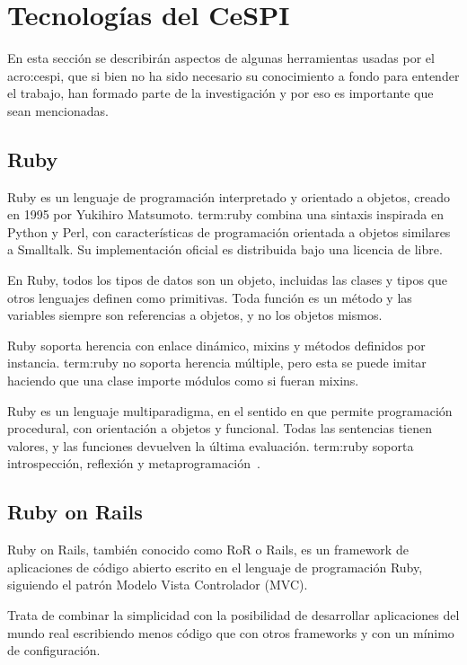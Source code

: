 \section{Tecnologías del CeSPI}
\label{anexo:A}

En esta sección se describirán aspectos de algunas herramientas usadas por el
\gls{acro:cespi}, que si bien no ha sido necesario su conocimiento a fondo para
entender el trabajo, han formado parte de la investigación y por eso es
importante que sean mencionadas.

\subsection{Ruby}

Ruby es un lenguaje de programación interpretado y orientado a objetos, creado
en 1995 por Yukihiro Matsumoto. \gls{term:ruby} combina una sintaxis inspirada
en Python y Perl, con características de programación orientada a objetos
similares a Smalltalk. Su implementación oficial es distribuida bajo una
licencia de  libre.

En Ruby, todos los tipos de datos son un objeto, incluidas las clases y tipos
que otros lenguajes definen como primitivas. Toda función es un método y las
variables siempre son referencias a objetos, y no los objetos mismos.

Ruby soporta herencia con enlace dinámico, mixins y métodos definidos por
instancia. \gls{term:ruby} no soporta herencia múltiple, pero esta se puede
imitar haciendo que una clase importe módulos como si fueran mixins.

Ruby es un lenguaje multiparadigma, en el sentido en que permite programación
procedural, con orientación a objetos y funcional. Todas las sentencias tienen
valores, y las funciones devuelven la última evaluación. \gls{term:ruby}
soporta introspección, reflexión y metaprogramación~\cite{ruby}.

\subsection{Ruby on Rails}

Ruby on Rails, también conocido como RoR o Rails, es un framework de
aplicaciones  de código abierto escrito en el lenguaje de programación
Ruby, siguiendo el patrón Modelo Vista Controlador (MVC).

Trata de combinar la simplicidad con la posibilidad de desarrollar aplicaciones
del mundo real escribiendo menos código que con otros frameworks y con un
mínimo de configuración.

